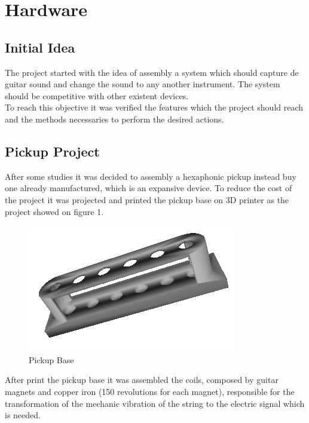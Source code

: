 \chapter{Hardware}
\section{Initial Idea}
The project started with the idea of assembly a system which should capture de guitar sound and change the sound to any another instrument. The system should be competitive with other existent devices.\\
To reach this objective it was verified the features which the project should reach and the methods necessaries to perform the desired actions.\\
\section{Pickup Project} 
After some studies it was decided to assembly a hexaphonic pickup instead buy one already manufactured, which is an expansive device. To reduce the cost of the project it was projected and printed the pickup base on 3D printer as the project showed on figure 1.

\begin{figure}[!htpb]
\centering
\includegraphics[scale=0.5]{textual-elements/hardware/Capt}
\caption{Pickup Base}
\end{figure}

After print the pickup base it was assembled the coils, composed by guitar magnets and copper iron (150 revolutions for each magnet), responsible for the transformation of the mechanic vibration of the string to the electric signal which is needed.   

